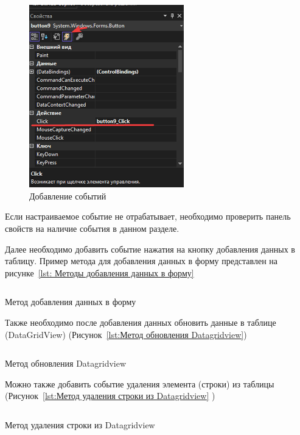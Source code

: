 \documentclass[12pt]{article}
\renewcommand{\texttt}[1]{{\small\ttfamily #1}}
\numberwithin{listing}{section}
\numberwithin{figure}{section}
\begin{document}
\begin{figure}[H]
	\centering
	\includegraphics[width=0.6\textwidth]{fig/image 31.jpg}
	\caption{Добавление событий}
	\label{fig:Добавление событий}
\end{figure}

Если настраиваемое событие не отрабатывает, необходимо проверить панель свойств на наличие события в данном разделе.

Далее необходимо добавить событие нажатия на кнопку добавления данных в таблицу. Пример метода для добавления данных в форму представлен на рисунке~\ref{lst: Методы добавления данных в форму}

\begin{listing}[H]
	\inputminted[firstline = 162, lastline=196]{csharp}{../../2lab/WinFormsApp1example_/Form1.cs}
	\caption{Метод добавления данных в форму}
	\label{lst: Методы добавления данных в форму}
\end{listing}

Также необходимо после добавления данных обновить данные в таблице (\texttt{DataGridView}) (Рисунок~\ref{lst:Метод обновления Datagridview})

\begin{listing}[H]
	\inputminted[firstline = 230, lastline=273]{csharp}{../../2lab/WinFormsApp1example_/Form1.cs}
	\caption{Метод обновления \texttt{Datagridview}}
	\label{lst:Метод обновления Datagridview}
\end{listing}


Можно также добавить событие удаления элемента (строки) из таблицы (Рисунок~\ref{lst:Метод удаления строки из Datagridview} )

\begin{listing}[H]
	\inputminted[firstline = 342, lastline=359]{csharp}{../../2lab/WinFormsApp1example_/Form1.cs}
	\caption{Метод удаления строки из \texttt{Datagridview}}
	\label{lst:Метод удаления строки из Datagridview}
\end{listing}
\end{document}
